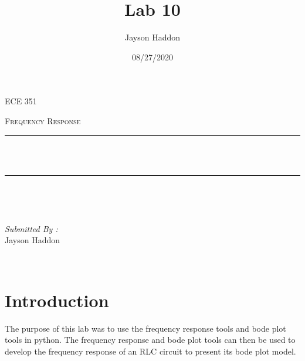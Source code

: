 \documentclass[11pt,a4]{report}
\title{Lab 10}
\author{Jayson Haddon}
\date{08/27/2020}
\makeatletter
\let\thetitle\@title
\makeatother
\begin{document}

\begin{titlepage}
	\centering
    \vspace*{0.5 cm}
\begin{center}    \textsc{\Large   ECE 351 }\\[2.0 cm]	\end{center}%
	\textsc{\Large Frequency Response  }\\[0.5 cm]				%
	\rule{\linewidth}{0.2 mm} \\[0.4 cm]
	{ \huge \bfseries \thetitle}\\
	\rule{\linewidth}{0.2 mm} \\[1.5 cm]
	
	\begin{minipage}{0.4\textwidth}
		\begin{flushleft} \large
			\end{flushleft}
			\end{minipage}~
			\begin{minipage}{0.4\textwidth}
            
			\begin{flushright} \large
			\emph{Submitted By :} \\
			Jayson Haddon  
		\end{flushright}
           
	\end{minipage}\\[2 cm]
	
    
    
    
    
	
\end{titlepage}

\tableofcontents
\pagebreak

\renewcommand{\thesection}{\arabic{section}}
\section{Introduction}
The purpose of this lab was to use the frequency response tools and bode plot tools in python. The frequency response and bode plot tools can then be used to develop the frequency response of an RLC circuit to present its bode plot model. 
\end{document}
